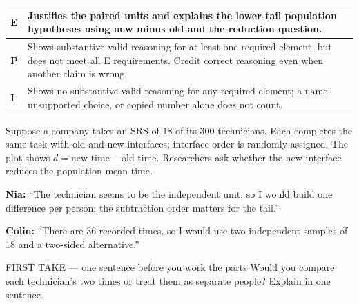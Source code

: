 \documentclass[11pt]{article}
\begin{document}
{\small\renewcommand{\arraystretch}{1.25}
\noindent\begin{tabular}{|p{0.5in}|p{5.9in}|}
\hline
\textbf{E} & Justifies the paired units and explains the lower-tail population hypotheses using new minus old and the reduction question. \\ \hline
\textbf{P} & Shows substantive valid reasoning for at least one required element, but does not meet all E requirements. Credit correct reasoning even when another claim is wrong. \\ \hline
\textbf{I} & Shows no substantive valid reasoning for any required element; a name, unsupported choice, or copied number alone does not count. \\ \hline
\end{tabular}}

\clearpage
{}

Suppose a company takes an SRS of 18 of its 300 technicians. Each completes the same task with old and new interfaces; interface order is randomly assigned. The plot shows $d=\text{new time}-\text{old time}$. Researchers ask whether the new interface reduces the population mean time.\par\smallskip \textbf{Nia:} ``The technician seems to be the independent unit, so I would build one difference per person; the subtraction order matters for the tail.''\par \textbf{Colin:} ``There are 36 recorded times, so I would use two independent samples of 18 and a two-sided alternative.''\par
\begin{center}
\end{center}
\begin{firsttakebox}{FIRST TAKE --- one sentence before you work the parts}
Would you compare each technician's two times or treat them as separate people? Explain in one sentence.\par
{}
\end{firsttakebox}
\end{document}
